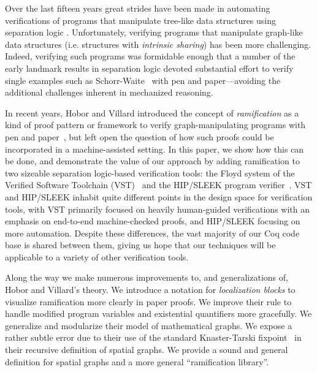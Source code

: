 Over the last fifteen years great strides have been made in automating verifications of programs that manipulate
tree-like data structures using separation logic 
\cite{berdine:smallfoot,chin:hipsleek,jacobs:verifast,chlipala:bedrock,bengtson:charge,appel:programlogics}.  Unfortunately, verifying programs that manipulate graph-like data structures (i.e. structures with \emph{intrinsic sharing}) has been more challenging.  Indeed, verifying such programs was formidable enough that a number of the early landmark results in separation logic devoted substantial effort to verify single examples such as Schorr-Waite~\cite{hongseok:phd} with pen and paper---avoiding the additional challenges inherent in mechanized reasoning.

In recent years, Hobor and Villard introduced the concept of \emph{ramification} as a kind of proof pattern or framework to verify graph-manipulating programs with pen and paper~\cite{hobor:ramification}, but left open the question of how such proofs could be incorporated in a machine-assisted setting.  In this paper, we show how this can be done, and demonstrate the value of our approach by adding ramification to two sizeable separation logic-based verification tools: the Floyd system of the Verified Software Toolchain (VST)~\cite{appel:programlogics} and the HIP/SLEEK program verifier~\cite{chin:hipsleek}.  VST and HIP/SLEEK inhabit quite different points in the design space for verification tools, with VST primarily focused on heavily human-guided verifications with an emphasis on end-to-end machine-checked proofs, and HIP/SLEEK focusing on more automation.  Despite these differences, the vast majority of our Coq code base is shared between them,
giving us hope that our techniques will be applicable to a variety of other verification tools.

Along the way we make numerous improvements to, and generalizations of, Hobor and Villard's theory.  We introduce a notation for \emph{localization blocks} to visualize ramification more clearly in paper proofs.  We improve their  rule to handle modified program variables and existential quantifiers more gracefully.  We generalize and modularize their model of mathematical graphs.  We expose a rather subtle error due to their use of the standard Knaster-Tarski fixpoint~\cite{tarski:fixpoint} in their recursive definition of spatial graphs.  We provide a sound and general definition for spatial graphs and a more general ``ramification library''.

